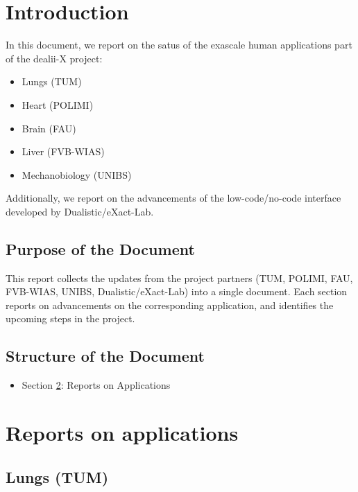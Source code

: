 \documentclass[a4paper,12pt]{article}
\begin{document}
\vspace*{2cm}

\disclaimer

\newpage

\tableofcontents %

\newpage

\section{{Introduction}}

In this document, we report on the satus of the exascale human applications part of the dealii-X project:
\begin{itemize}
    \item Lungs (TUM)
    \item Heart (POLIMI)
    \item Brain (FAU)
    \item Liver (FVB-WIAS)
    \item Mechanobiology (UNIBS)
\end{itemize}
Additionally, we report on the advancements of the low-code/no-code interface developed by Dualistic/eXact-Lab.

\subsection{{Purpose of the Document}}

This report collects the updates from the project partners (TUM, POLIMI, FAU, FVB-WIAS, UNIBS, Dualistic/eXact-Lab) into a single document. Each section reports on advancements on the corresponding application, and identifies the upcoming steps in the project.

\subsection{{Structure of the Document}}
\begin{itemize}
    \item Section \ref{sec:section2}: Reports on Applications
\end{itemize}

\newpage

\section{{Reports on applications}}
\label{sec:section2}

\subsection{Lungs (TUM)}
\end{document}
